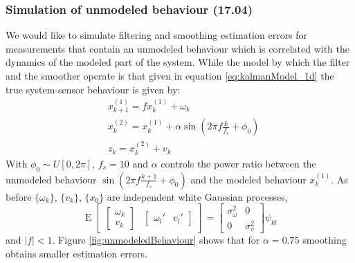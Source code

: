 \documentclass[oneside,12pt]{article}
\newcommand{\abs}[1]{\left| #1\right| }                   %
\begin{document}
\subsubsection{Simulation of unmodeled behaviour (17.04)}
We would like to simulate filtering and smoothing estimation errors for measurements that contain an unmodeled behaviour which is correlated with the dynamics of the modeled part of the system.
While the model by which the filter and the smoother operate is that given in equation \ref{eq:kalmanModel_1d} the true system-sensor behaviour is given by:
%
\begin{equation}\label{eq:kalman_1d_unmodeled}
    \begin{split}
        &x^{(1)}_{k+1} = fx^{(1)}_k + \omega_k\\
        &x^{(2)}_{k} = x^{(1)}_{k} + \alpha\operatorname{sin}(2\pi f \frac{k}{f_s} + \phi_0)\\
        &z_k = x^{(2)}_k + v_k
    \end{split}
\end{equation}
%
With $\phi_0 \sim U[0, 2\pi]$, $f_s = 10$ and $\alpha$ controls the power ratio between the unmodeled behaviour $\operatorname{sin}(2\pi f \frac{k+1}{f_s} + \phi_0)$ and the modeled behaviour $x^{(1)}_{k}$. As before $\{\omega_k\}$, $\{v_k\}$, $\{x_0\}$ are independent white Gaussian processes,
%
\begin{equation*}
    \operatorname{E} \begin{bmatrix} \begin{bmatrix} \omega_k \\ v_k \end{bmatrix} &  \begin{bmatrix} \omega_l' & v_l' \end{bmatrix} \end{bmatrix} = \begin{bmatrix} \sigma_\omega^2 & 0 \\ 0 & \sigma_v^2\end{bmatrix} \psi_{kl}
\end{equation*}
%
and $\abs{f}<1$. Figure \ref{fig:unmodeledBehaviour} shows that for $\alpha=0.75$ smoothing obtains smaller estimation errors. 
%
\end{document}
